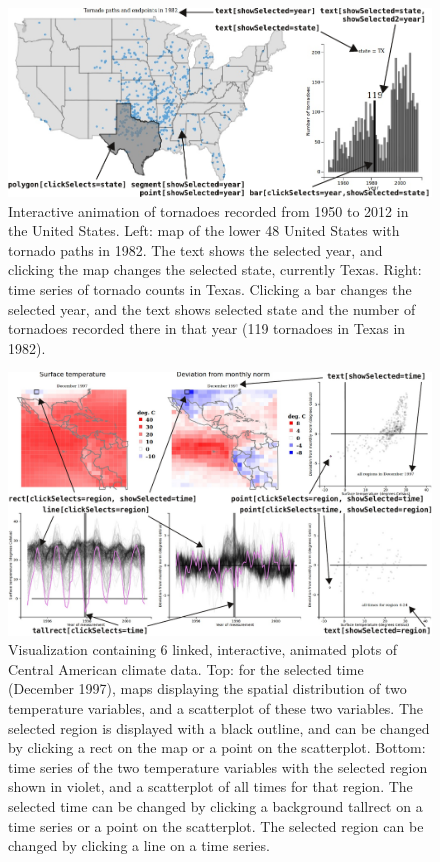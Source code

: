 \documentclass[12pt,]{isuthesis}
\begin{document}
\begin{figure}[htbp]
\centering
\includegraphics{images/figure-tornado.pdf}
\caption{\label{fig:tornado}Interactive animation of tornadoes recorded from
1950 to 2012 in the United States. Left: map of the lower 48 United
States with tornado paths in 1982. The text shows the selected year, and
clicking the map changes the selected state, currently Texas. Right:
time series of tornado counts in Texas. Clicking a bar changes the
selected year, and the text shows selected state and the number of
tornadoes recorded there in that year (119 tornadoes in Texas in 1982).}
\end{figure}

\begin{figure}[htbp]
\centering
\includegraphics{images/figure-climate.pdf}
\caption{\label{fig:climate}Visualization containing 6 linked, interactive,
animated plots of Central American climate data. Top: for the selected
time (December 1997), maps displaying the spatial distribution of two
temperature variables, and a scatterplot of these two variables. The
selected region is displayed with a black outline, and can be changed by
clicking a rect on the map or a point on the scatterplot. Bottom: time
series of the two temperature variables with the selected region shown
in violet, and a scatterplot of all times for that region. The selected
time can be changed by clicking a background tallrect on a time series
or a point on the scatterplot. The selected region can be changed by
clicking a line on a time series.}
\end{figure}
\end{document}
